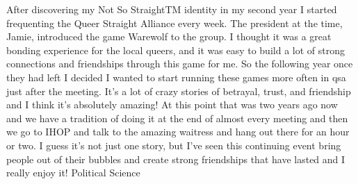 {After discovering my Not So StraightTM identity in my second year I started 
frequenting the Queer Straight Alliance every week. The president at the time, 
Jamie, introduced the game Warewolf to the group. I thought it was a great 
bonding experience for the local queers, and it was easy to build a lot of 
strong connections and friendships through this game for me. So the following 
year once they had left I decided I wanted to start running these games more 
often in qsa just after the meeting. It's a lot of crazy stories of betrayal, 
trust, and friendship and I think it's absolutely amazing! At this point that 
was two years ago now and we have a tradition of doing it at the end of almost 
every meeting and then we go to IHOP and talk to the amazing waitress and hang 
out there for an hour or two. I guess it's not just one story, but I've seen 
this continuing event bring people out of their bubbles and create strong 
friendships that have lasted and I really enjoy it!}
{\she}{Political Science}{}
{\asexualflagstory}
